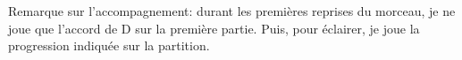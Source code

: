 

\tune

Remarque sur l'accompagnement: durant les premières reprises du morceau, je ne
joue que l'accord de D sur la première partie. Puis, pour éclairer, je joue la
progression indiquée sur la partition.

